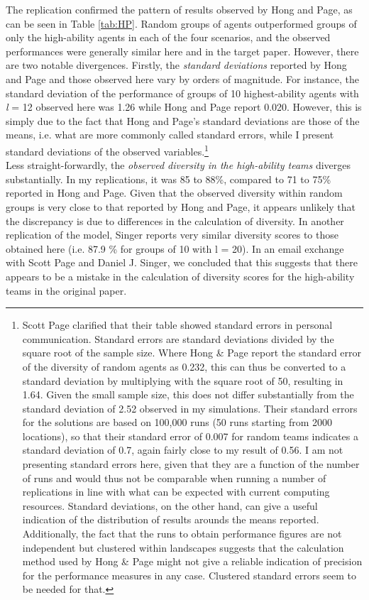     
The replication confirmed the pattern of results observed by Hong and Page, as can be seen in Table \ref{tab:HP}. Random groups of agents outperformed groups of only the high-ability agents in each of the four scenarios, and the observed performances were generally similar here and in the target paper. However, there are two notable divergences. Firstly, the \textit{standard deviations} reported by Hong and Page and those observed here vary by orders of magnitude. For instance, the standard deviation of the performance of groups of 10 highest-ability agents with \textit{l} = 12 observed here was 1.26 while Hong and Page report 0.020. However, this is simply due to the fact that Hong and Page's standard deviations are those of the means, i.e. what are more commonly called standard errors, while I present standard deviations of the observed variables.\footnote{Scott Page clarified that their table showed standard errors in personal communication. Standard errors are standard deviations divided by the square root of the sample size. Where Hong \& Page report the standard error of the diversity of random agents as 0.232, this can thus be converted to a standard deviation by multiplying with the square root of 50, resulting in 1.64. Given the small sample size, this does not differ substantially from the standard deviation of 2.52 observed in my simulations. Their standard errors for the solutions are based on 100,000 runs (50 runs starting from 2000 locations), so that their standard error of 0.007 for random teams indicates a standard deviation of 0.7, again fairly close to my result of 0.56. I am not presenting standard errors here, given that they are a function of the number of runs and would thus not be comparable when running a number of replications in line with what can be expected with current computing resources. Standard deviations, on the other hand, can give a useful indication of the distribution of results arounds the means reported. Additionally, the fact that the runs to obtain performance figures are not independent but clustered within landscapes suggests that the calculation method used by Hong \& Page might not give a reliable indication of precision for the performance measures in any case. Clustered standard errors seem to be needed for that.} \\

Less straight-forwardly, the \textit{observed diversity in the high-ability teams} diverges substantially. In my replications, it was 85 to 88\%, compared to 71 to 75\% reported in Hong and Page. Given that the observed diversity within random groups is very close to that reported by Hong and Page, it appears unlikely that the discrepancy is due to differences in the calculation of diversity. In another replication of the model, Singer \supercite{singer2019diversity} reports very similar diversity scores to those obtained here (i.e. 87.9 \% for groups of 10 with l = 20). In an email exchange with Scott Page and Daniel J. Singer, we concluded that this suggests that there appears to be a mistake in the calculation of diversity scores for the high-ability teams in the original paper. \\

